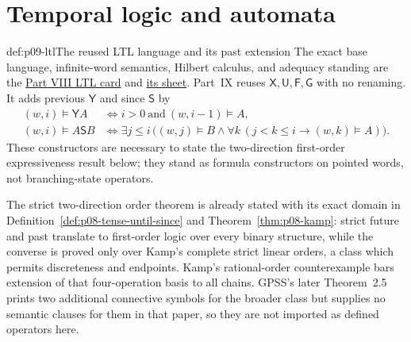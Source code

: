 \section{Temporal logic and automata}
\label{sec:p09-temporal-automata}

\begin{hbdefinition}{def:p09-ltl}{The reused LTL language and its past extension}
The exact base language, infinite-word semantics, Hilbert calculus, and
adequacy standing are the \hyperref[entry:p08-ltl]{Part VIII LTL card} and
\hyperref[sheet:hilbert-ltl]{its sheet}.  Part~IX reuses
\(\mathsf X,\mathsf U,\mathsf F,\mathsf G\) with no renaming.  It adds previous
\(\mathsf Y\) and since \(\mathsf S\) by
\[
\begin{aligned}
 (w,i)\models\mathsf Y A
 &\Longleftrightarrow i>0\ \text{and}\ (w,i-1)\models A,\\
 (w,i)\models A\mathbin{\mathsf S}B
 &\Longleftrightarrow
 \exists j\le i\,
 \bigl((w,j)\models B\land
   \forall k\,(j<k\le i\to(w,k)\models A)\bigr).
\end{aligned}
\]
These constructors are necessary to state the two-direction first-order
expressiveness result below; they stand as formula constructors on pointed
words, not branching-state operators.
\end{hbdefinition}

The strict two-direction order theorem is already stated with its exact domain
in Definition~\ref{def:p08-tense-until-since} and
Theorem~\ref{thm:p08-kamp}: strict future and past translate to first-order
logic over every binary structure, while the converse is proved only over
Kamp's complete strict linear orders, a class which permits discreteness and
endpoints.  Kamp's rational-order counterexample bars extension of that
four-operation basis to all chains.  GPSS's later Theorem~2.5 prints two
additional connective symbols for the broader class but supplies no semantic
clauses for them in that paper, so they are not imported as defined operators
here.

